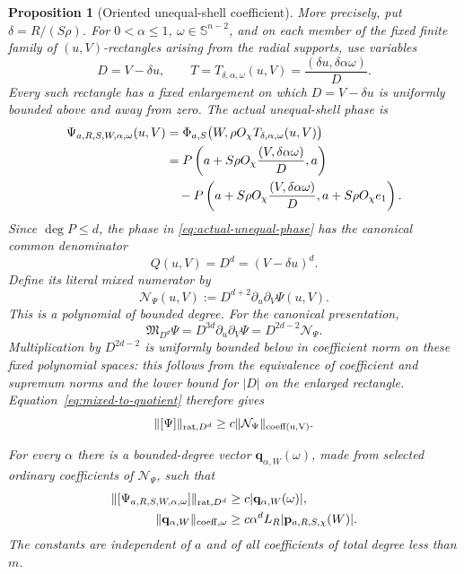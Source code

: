 \documentclass[11pt]{article}
\numberwithin{equation}{section}
\newtheorem{proposition}[theorem]{Proposition}
\theoremstyle{remark}
\theoremstyle{definition}
\newcommand{\Sph}{\mathbb S}
\newcommand{\norm}[1]{\lVert #1\rVert}
\newcommand{\abs}[1]{\lvert #1\rvert}
\begin{document}
\begin{proposition}[Oriented unequal-shell coefficient]
More precisely, put \(\delta=R/(S\rho)\).  For
\(0<\alpha\le1\), \(\omega\in\Sph^{n-2}\), and on each member of the
fixed finite family of \((u,V)\)-rectangles arising from the radial
supports, use variables
\begin{equation}\label{eq:unequal-projective-map}
 D=V-\delta u,
 \qquad
 T=T_{\delta,\alpha,\omega}(u,V)
 =\frac{(\delta u,\delta\alpha\omega)}{D}.
\end{equation}
Every such rectangle has a fixed enlargement on which
\(D=V-\delta u\) is uniformly bounded above and away from zero.  The
actual unequal-shell phase is
\begin{align}
 \Psi_{a,R,S,W,\alpha,\omega}(u,V)
 &=\Phi_{a,S}\bigl(W,\rho O_\chi
 T_{\delta,\alpha,\omega}(u,V)\bigr) \notag\\
 &=P\left(a+S\rho O_\chi
      \frac{(V,\delta\alpha\omega)}{D},a\right) \notag\\
 &\quad-P\left(a+S\rho O_\chi
      \frac{(V,\delta\alpha\omega)}{D},
      a+S\rho O_\chi e_1\right).
 \label{eq:actual-unequal-phase}
\end{align}
Since \(\deg P\le d\), the
phase in \eqref{eq:actual-unequal-phase} has the canonical common
denominator
\[
 Q(u,V)=D^d=(V-\delta u)^d.
\]
Define its literal mixed numerator by
\begin{equation}\label{eq:actual-mixed-numerator}
 \mathcal N_\Psi(u,V)
 :=D^{d+2}\partial_u\partial_V\Psi(u,V).
\end{equation}
This is a polynomial of bounded degree.  For the canonical presentation,
\[
 \mathfrak M_{D^d}\Psi
 =D^{3d}\partial_u\partial_V\Psi
 =D^{2d-2}\mathcal N_\Psi.
\]
Multiplication by \(D^{2d-2}\) is uniformly bounded below in coefficient
norm on these fixed polynomial spaces: this follows from the equivalence
of coefficient and supremum norms and the lower bound for \(|D|\) on the enlarged
rectangle.  Equation~\eqref{eq:mixed-to-quotient} therefore gives
\begin{equation}\label{eq:actual-mixed-to-quotient}
 \norm{[\Psi]}_{{\rm rat},D^d}
 \ge c\norm{\mathcal N_\Psi}_{\rm coeff(u,V)}.
\end{equation}

For every \(\alpha\) there is a bounded-degree vector
\(\mathbf q_{\alpha,W}(\omega)\), made from selected ordinary
coefficients of \(\mathcal N_\Psi\), such that
\begin{align}
 \norm{[\Psi_{a,R,S,W,\alpha,\omega}]}_{{\rm rat},D^d}
 &\ge c\abs{\mathbf q_{\alpha,W}(\omega)},
 \label{eq:oriented-band-lower}\\
 \norm{\mathbf q_{\alpha,W}}_{{\rm coeff},\omega}
 &\ge c\alpha^dL_R
 \abs{\mathbf p_{a,R,S,\chi}(W)}.
 \label{eq:oriented-band-lower-b}
\end{align}
The constants are independent of \(a\) and of all coefficients of total
degree less than \(m\).
\end{proposition}
\end{document}
